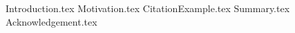 \documentclass[aspectratio=169]{beamer}
\begin{document}
\maketitlepage %
\maketableofcontents %
\makesubsectionpopup %

{Introduction.tex}
{Motivation.tex}
{CitationExample.tex}
{Summary.tex}
{Acknowledgement.tex}
\end{document}
